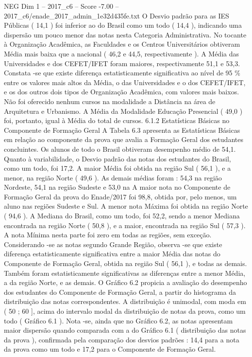 \begin{textsample}{NEG Dim 1 – 2017\_c6 – Score -7.00 – 2017\_c6/enade\_2017\_admin\_1e32d435fe.txt}
O Desvio padrão para as IES Públicas ( 14,1 ) foi inferior ao do Brasil como um todo ( 14,4 ), indicando uma dispersão um pouco menor das notas nesta Categoria Administrativa.
No tocante à Organização Acadêmica, as Faculdades e os Centros Universitários obtiveram Média mais baixa que a nacional ( 46,2 e 44,5, respectivamente ).
A Média das Universidades e dos CEFET/IFET foram maiores, respectivamente 51,1 e 53,3.
Constata -se que existe diferença estatisticamente significativa ao nível de 95 \% entre os valores mais altos da Média, o das Universidades e o dos CEFET/IFET, e os dos outros dois tipos de Organização Acadêmica, com valores mais baixos.
Não foi oferecido nenhum cursos na modalidade a Distância na área de Arquitetura e Urbanismo.
A Média da Modalidade Educação Presencial ( 49,0 ) foi, portanto, igual à Média do total de cursos. 6.1.2 Estatísticas Básicas no Componente de Formação Geral A Tabela 6.3 apresenta as Estatísticas Básicas em relação ao componente da prova que avalia a Formação Geral dos estudantes concluintes.
Os alunos de todo o Brasil obtiveram desempenho médio de 54,1.
Quanto à variabilidade, o Desvio padrão das notas dos estudantes do Brasil, como um todo, foi 17,2.
A maior Média foi obtida na região Sul ( 56,1 ), e a menor, na região Norte ( 49,6 ).
As demais médias foram : 54,3 na região Nordeste, 54,1 na região Sudeste e 53,0 na A maior nota no Componente de Formação Geral da prova do Enade/2017 foi 98,8, obtida por, pelo menos, um aluno nas regiões Sudeste e Sul.
A menor nota Máxima foi obtida na região Norte ( 94,6 ).
A Mediana do Brasil, como um todo, foi 52,2, sendo a menor Mediana encontrada na região Norte ( 50,8 ), e a maior, encontrada na região Sul ( 57,3 ).
A nota Mínima nesta parte foi zero em todas as regiões, sem exceção.
Considerando -se as notas segundo Grande Região, observa -se que existe diferença estatisticamente significativa entre a maior Média das notas do Componente de Formação Geral, obtida na região Sul ( 56,1 ), e todas as demais.
Também foram estatisticamente significativas as diferenças entre a menor Média, a da região Norte, e as demais.
O Gráfico 6.2 propicia a avaliação do desempenho dos estudantes do Componente de Formação Geral, a partir do histograma da distribuição das notas correspondentes.
A distribuição é unimodal, com moda em ( 50 ; 60 ], acima do intervalo modal da distribuição de notas da prova, como um todo ( Gráfico 6.1 ).
Nota -se, ainda que no Gráfico 6.2, as notas apresentam maior dispersão quando comparada com a do Gráfico 6.1 ( distribuição das notas da prova ), confirmada pela comparação dos desvios padrões : 14,4 para a nota da prova como um todo e 17,2 para o Componente de Formação Geral.

\end{textsample}
